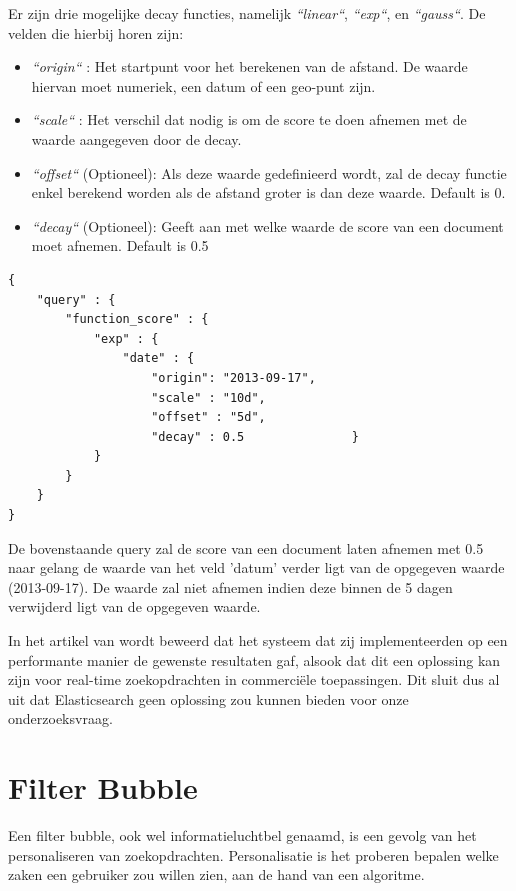 Er zijn drie mogelijke decay functies, namelijk \textit{``linear``}, \textit{``exp``}, en \textit{``gauss``}. De velden die hierbij horen zijn:

\begin{itemize}
	\item \textit{``origin``} : Het startpunt voor het berekenen van de afstand. De waarde hiervan moet numeriek, een datum of een geo-punt zijn.
	\item \textit{``scale``} : Het verschil dat nodig is om de score te doen afnemen met de waarde aangegeven door de decay.
	\item \textit{``offset``} (Optioneel):  Als deze waarde gedefinieerd wordt, zal de decay functie enkel berekend worden als de afstand groter is dan deze waarde. Default is 0.
	\item \textit{``decay``} (Optioneel): Geeft aan met welke waarde de score van een document moet afnemen. Default is 0.5
\end{itemize}


\begin{lstlisting}[caption={Decay: voorbeeld van een decay functie}]
{
	"query" : {
		"function_score" : {
			"exp" : {
				"date" : {
					"origin": "2013-09-17",
					"scale" : "10d",
					"offset" : "5d",
					"decay" : 0.5				}
			}
		}
	}
}
\end{lstlisting}

De bovenstaande query zal de score van een document laten afnemen met 0.5 naar gelang de waarde van het veld 'datum' verder ligt van de opgegeven waarde (2013-09-17). De waarde zal niet afnemen indien deze binnen de 5 dagen verwijderd ligt van de opgegeven waarde.

 In het artikel van \autocite{Vavliakis2019} wordt beweerd dat het systeem dat zij implementeerden op een performante manier de gewenste resultaten gaf, alsook dat dit een oplossing kan zijn voor real-time zoekopdrachten in commerciële toepassingen. Dit sluit dus al uit dat Elasticsearch geen oplossing zou kunnen bieden voor onze onderzoeksvraag.
 
\section{Filter Bubble}
\label{sec:Filter Bubble}

Een filter bubble, ook wel informatieluchtbel genaamd, is een gevolg van het personaliseren van zoekopdrachten. Personalisatie is het proberen bepalen welke zaken een gebruiker zou willen zien, aan de hand van een algoritme. 

